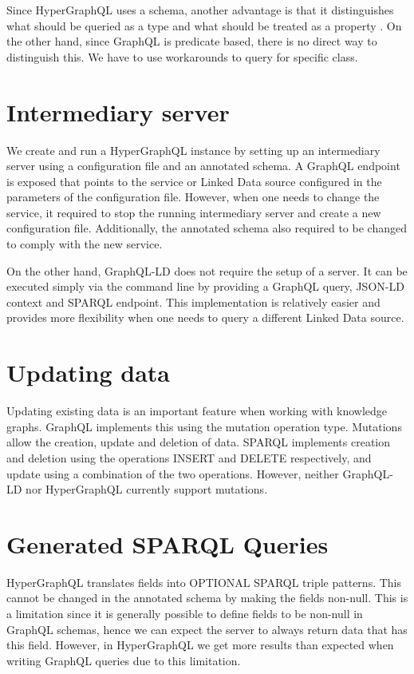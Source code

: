 Since HyperGraphQL uses a schema, another advantage is that it distinguishes what should be queried as a type and what should be treated as a property \cite{Werbrouck2019a}. On the other hand, since GraphQL is predicate based, there is no direct way to distinguish this. We have to use workarounds to query for specific class.


\section{Intermediary server}
We create and run a HyperGraphQL instance by setting up an intermediary server using a configuration file and an annotated schema. A GraphQL endpoint is exposed that points to the service or Linked Data source configured in the parameters of the configuration file. However, when one needs to change the service, it required to stop the running intermediary server and create a new configuration file. Additionally, the annotated schema also required to be changed to comply with the new service. 

On the other hand, GraphQL-LD does not require the setup of a server. It can be executed simply via the command line by providing a GraphQL query, JSON-LD context and SPARQL endpoint. This implementation is relatively easier and provides more flexibility when one needs to query a different Linked Data source.


\section{Updating data}
Updating existing data is an important feature when working with knowledge graphs. GraphQL implements this using the mutation operation type. Mutations allow the creation, update and deletion of data. SPARQL implements creation and deletion using the operations INSERT and DELETE respectively, and update using a combination of the two operations. However, neither GraphQL-LD nor HyperGraphQL currently support mutations.


\section{Generated SPARQL Queries}
HyperGraphQL translates fields into OPTIONAL SPARQL triple patterns. This cannot be changed in the annotated schema by making the fields non-null. This is a limitation since it is generally possible to define fields to be non-null in GraphQL schemas, hence we can expect the server to always return data that has this field. However, in HyperGraphQL we get more results than expected when writing GraphQL queries due to this limitation. 


